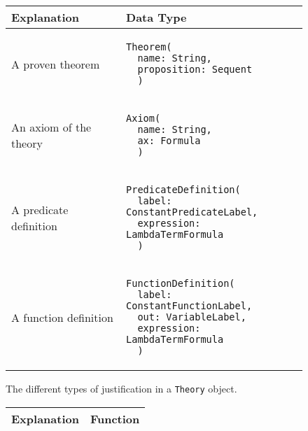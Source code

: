   {
    \def\arraystretch{4}

    \begin{figure}[hp]
      \begin{center}
        \begin{tabular}{l|l}
          Explanation            & Data Type
          \\ \hline

          A proven theorem       &
          \begin{lstlisting}
Theorem(
  name: String,
  proposition: Sequent
  )

\end{lstlisting}
          \\ %

          An axiom of the theory &
          \begin{lstlisting}
Axiom(
  name: String,
  ax: Formula
  )

\end{lstlisting}
          \\ %

          A predicate definition &
          \begin{lstlisting}
PredicateDefinition(
  label: ConstantPredicateLabel,
  expression: LambdaTermFormula
  )

\end{lstlisting}
          \\ %

          A function definition  &
          \begin{lstlisting}
FunctionDefinition(
  label: ConstantFunctionLabel,
  out: VariableLabel,
  expression: LambdaTermFormula
  )

\end{lstlisting}
          \\ %
        \end{tabular}

        \caption{The different types of justification in a \lstinline{Theory}{} object.}
        \label{fig:justifications}
      \end{center}
    \end{figure}

    \begin{figure}[hp]
      \begin{center}
        \begin{tabular}{l|l}
          Explanation & Function
          \\ \hline


\end{tabular}
\end{center}
\end{figure}}
